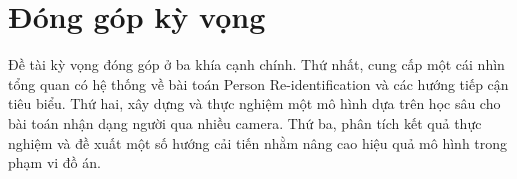 \section{Đóng góp kỳ vọng}
Đề tài kỳ vọng đóng góp ở ba khía cạnh chính. Thứ nhất, cung cấp một cái nhìn tổng quan có hệ thống về bài toán Person Re-identification và các hướng tiếp cận tiêu biểu. Thứ hai, xây dựng và thực nghiệm một mô hình dựa trên học sâu cho bài toán nhận dạng người qua nhiều camera. Thứ ba, phân tích kết quả thực nghiệm và đề xuất một số hướng cải tiến nhằm nâng cao hiệu quả mô hình trong phạm vi đồ án.
